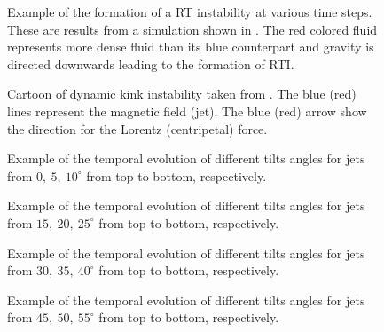 \documentclass[12pt]{ociamthesis}
\begin{document}
\begin{figure}
\captionsetup[subfigure]{labelformat=empty}
\centering
{}
\caption{Example of the formation of a RT instability at various time steps. These are results from a simulation shown in \cite{Liang2019PhFl31k2104L}. The red colored fluid represents more dense fluid than its blue counterpart and gravity is directed downwards leading to the formation of RTI.}
\label{RT_example}
\end{figure}
\begin{figure}
\captionsetup[subfigure]{labelformat=empty}
\centering
{}
\caption{Cartoon of dynamic kink instability taken from \cite{Zaqarashvili2020ApJ893L46Z}. The blue (red) lines represent the magnetic field (jet). The blue (red) arrow show the direction for the Lorentz (centripetal) force.}
\label{DKI_example}
\end{figure}
\begin{figure}
\captionsetup[subfigure]{labelformat=empty}
\centering
{}
\caption{Example of the temporal evolution of different tilts angles for jets from $0,~5,~10^{\circ}$ from top to bottom, respectively.}
\label{tj_morph_1}
\end{figure}
\begin{figure}
\captionsetup[subfigure]{labelformat=empty}
\centering
{}
\caption{Example of the temporal evolution of different tilts angles for jets from $15,~20,~25^{\circ}$ from top to bottom, respectively.}
\label{tj_morph_2}
\end{figure}
\begin{figure}
\captionsetup[subfigure]{labelformat=empty}
\centering
{}
\caption{Example of the temporal evolution of different tilts angles for jets from $30,~35,~40^{\circ}$ from top to bottom, respectively.}
\label{tj_morph_3}
\end{figure}
\begin{figure}
\captionsetup[subfigure]{labelformat=empty}
\centering
{}
\caption{Example of the temporal evolution of different tilts angles for jets from $45,~50,~55^{\circ}$ from top to bottom, respectively.}
\label{tj_morph_4}
\end{figure}
\end{document}
